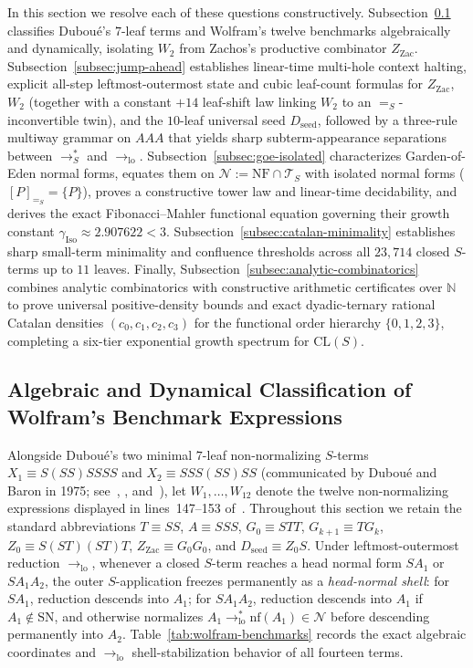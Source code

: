 \documentclass[11pt,reqno]{amsart}
\numberwithin{equation}{section}
\theoremstyle{plain}
\theoremstyle{definition}
\theoremstyle{remark}
\newcommand{\CLS}{\mathrm{CL}(S)}
\newcommand{\TS}{\mathcal{T}_S}
\newcommand{\NF}{\mathrm{NF}}
\newcommand{\SN}{\mathrm{SN}}
\newcommand{\redSs}{\to_S^*}
\newcommand{\convS}{=_S}
\begin{document}
In this section we resolve each of these questions constructively. Subsection~\ref{subsec:wolfram-14-benchmarks} classifies Dubou\'e's $7$-leaf terms and Wolfram's twelve benchmarks algebraically and dynamically, isolating $W_2$ from Zachos's productive combinator $Z_{\mathrm{Zac}}$. Subsection~\ref{subsec:jump-ahead} establishes linear-time multi-hole context halting, explicit all-step leftmost-outermost state and cubic leaf-count formulas for $Z_{\mathrm{Zac}}$, $W_2$ (together with a constant $+14$ leaf-shift law linking $W_2$ to an $\convS$-inconvertible twin), and the $10$-leaf universal seed $D_{\mathrm{seed}}$, followed by a three-rule multiway grammar on $A A A$ that yields sharp subterm-appearance separations between $\redSs$ and $\to_{\mathrm{lo}}$. Subsection~\ref{subsec:goe-isolated} characterizes Garden-of-Eden normal forms, equates them on $\mathcal{N} := \NF \cap \TS$ with isolated normal forms ($[P]_{\convS} = \{P\}$), proves a constructive tower law and linear-time decidability, and derives the exact Fibonacci--Mahler functional equation governing their growth constant $\gamma_{\mathrm{Iso}} \approx 2.907622 < 3$. Subsection~\ref{subsec:catalan-minimality} establishes sharp small-term minimality and confluence thresholds across all $23{,}714$ closed $S$-terms up to $11$ leaves. Finally, Subsection~\ref{subsec:analytic-combinatorics} combines analytic combinatorics with constructive arithmetic certificates over $\mathbb{N}$ to prove universal positive-density bounds and exact dyadic-ternary rational Catalan densities $(c_0, c_1, c_2, c_3)$ for the functional order hierarchy $\{0, 1, 2, 3\}$, completing a six-tier exponential growth spectrum for $\CLS$.

\subsection{Algebraic and Dynamical Classification of Wolfram's Benchmark Expressions}
\label{subsec:wolfram-14-benchmarks}

Alongside Dubou\'e's two minimal $7$-leaf non-normalizing $S$-terms $X_1 \equiv S(S S)S S S S$ and $X_2 \equiv S S S (S S) S S$ (communicated by Dubou\'e and Baron in 1975; see~\cite{BarendregtBergstraKlopVolken1976}, \cite[Exercise~7.4.5]{Barendregt1984}, and~\cite[line~131]{Wolfram2021Challenge}), let $W_1, \dots, W_{12}$ denote the twelve non-normalizing expressions displayed in lines~147--153 of~\cite{Wolfram2021Challenge}. Throughout this section we retain the standard abbreviations $T \equiv S S$, $A \equiv S S S$, $G_0 \equiv S T T$, $G_{k+1} \equiv T G_k$, $Z_0 \equiv S(S T)(S T)T$, $Z_{\mathrm{Zac}} \equiv G_0 G_0$, and $D_{\mathrm{seed}} \equiv Z_0 S$. Under leftmost-outermost reduction $\to_{\mathrm{lo}}$, whenever a closed $S$-term reaches a head normal form $S A_1$ or $S A_1 A_2$, the outer $S$-application freezes permanently as a \emph{head-normal shell}: for $S A_1$, reduction descends into $A_1$; for $S A_1 A_2$, reduction descends into $A_1$ if $A_1 \notin \SN$, and otherwise normalizes $A_1 \to_{\mathrm{lo}}^* \mathrm{nf}(A_1) \in \mathcal{N}$ before descending permanently into $A_2$. Table~\ref{tab:wolfram-benchmarks} records the exact algebraic coordinates and $\to_{\mathrm{lo}}$ shell-stabilization behavior of all fourteen terms.
\end{document}
